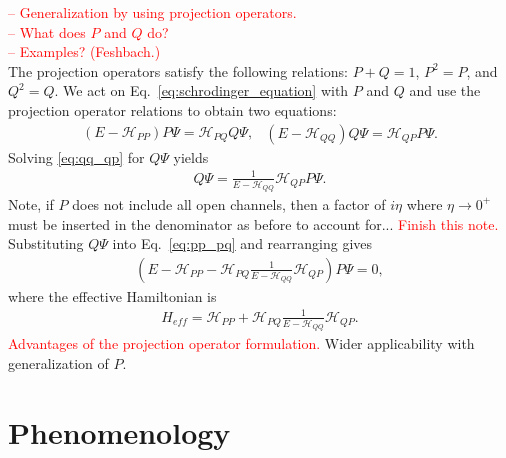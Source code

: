 \documentclass[preprintnumbers,floatfix,aps,prc,preprint,nofootinbib]{revtex4-1}
\begin{document}
\textcolor{red}{%
-- Generalization by using projection operators.
\\
-- What does $P$ and $Q$ do?
\\
-- Examples? (Feshbach.)}
\\
The projection operators satisfy the following relations: $P+Q=1$, $P^2 = P$, and $Q^2 = Q$. We act on Eq.~\ref{eq:schrodinger_equation} with $P$ and $Q$ and use the projection operator relations to obtain two equations:
%
\begin{subequations}
	\label{eq:intermediate_effective_hamiltonian_equations}
	\begin{eqnarray}
		\label{eq:pp_pq}
		(E - \mathcal{H}_{PP}) P \Psi = \mathcal{H}_{PQ} Q \Psi,
	\end{eqnarray}
	\begin{eqnarray}
		\label{eq:qq_qp}
		(E - \mathcal{H}_{QQ}) Q \Psi = \mathcal{H}_{QP} P \Psi.
	\end{eqnarray}
\end{subequations}
%
Solving \ref{eq:qq_qp} for $Q \Psi$ yields
%
\begin{eqnarray}
	\label{eq:q_psi}
	Q \Psi = \frac{1}{E - \mathcal{H}_{QQ}} \mathcal{H}_{QP} P \Psi.
\end{eqnarray}
%
Note, if $P$ does not include all open channels, then a factor of $i \eta$ where $\eta \rightarrow 0^+$ must be inserted in the denominator as before to account for... \textcolor{red}{Finish this note.} Substituting $Q \Psi$ into Eq.~\ref{eq:pp_pq} and rearranging gives
%
\begin{eqnarray}
	\label{p_psi}
	(E - \mathcal{H}_{PP} - \mathcal{H}_{PQ} \frac{1}{E - \mathcal{H}_{QQ}} \mathcal{H}_{QP}) P \Psi = 0,
\end{eqnarray}
%
where the effective Hamiltonian is
%
\begin{eqnarray}
	\label{eq:effective_hamiltonian}
	H_{eff} = \mathcal{H}_{PP} + \mathcal{H}_{PQ} \frac{1}{E - \mathcal{H}_{QQ}} \mathcal{H}_{QP}.
\end{eqnarray}
%
\textcolor{red}{Advantages of the projection operator formulation.} Wider applicability with generalization of $P$.	


\section{Phenomenology}
\label{sec:phenomenology}
\end{document}
